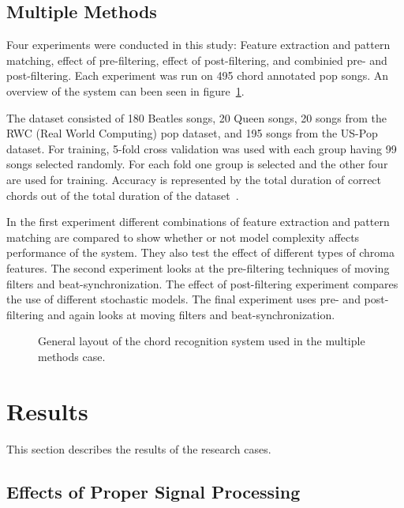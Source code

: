 \documentclass{sig-alternate}
\begin{document}
\subsection{Multiple Methods}

Four experiments were conducted in this study: Feature extraction and pattern matching, effect of pre-filtering, effect of post-filtering, and combinied pre- and post-filtering. Each experiment was run on 495 chord annotated pop songs. An overview of the system can been seen in figure~\ref{fig:fig3}.

The dataset consisted of 180 Beatles songs, 20 Queen songs, 20 songs from the RWC (Real World Computing) pop dataset, and 195 songs from the US-Pop dataset. For training, 5-fold cross validation was used with each group having 99 songs selected randomly. For each fold one group is selected and the other four are used for training. Accuracy is represented by the total duration of correct chords out of the total duration of the dataset~\cite{TaeMin:2014}.

In the first experiment different combinations of feature extraction and pattern matching are compared to show whether or not model complexity affects performance of the system. They also test the effect of different types of chroma features. The second experiment looks at the pre-filtering techniques of moving filters and beat-synchronization. The effect of post-filtering experiment compares the use of different stochastic models. The final experiment uses pre- and post-filtering and again looks at moving filters and beat-synchronization.


\begin{figure}
\centering
{}
\caption{General layout of the chord recognition system used in the multiple methods case.}
\label{fig:fig3}
\end{figure}

\section{Results}

This section describes the results of the research cases.

\subsection{Effects of Proper Signal Processing}
\end{document}
